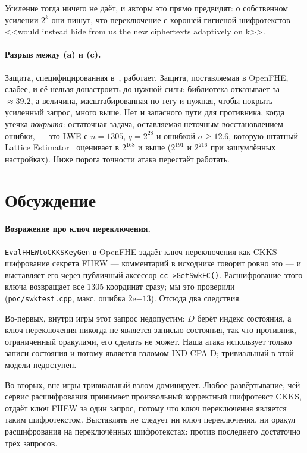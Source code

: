 \documentclass[11pt]{article}
\newcommand{\code}[1]{\texttt{#1}}
\begin{document}
Усиление тогда ничего не даёт, и авторы это прямо предвидят: о собственном усилении $2^k$ они пишут,
что переключение с хорошей гигиеной шифротекстов <<would instead hide from us the new ciphertexts
adaptively on k>>.

\paragraph{Разрыв между (a) и (c).}
Защита, специфицированная в~\cite{santato2026}, работает. Защита, поставляемая в OpenFHE,
слабее, и её нельзя донастроить до нужной силы: библиотека отказывает за
$\approx 39.2$, а величина, масштабированная по тегу и нужная, чтобы покрыть усиленный запрос, много
выше. Нет и запасного пути для противника, когда утечка \emph{покрыта}: остаточная задача, оставляемая
неточным восстановлением ошибки, --- это LWE с $n = 1305$, $q = 2^{28}$ и ошибкой $\sigma \geq 12.6$,
которую штатный Lattice Estimator~\cite{latticeestimator} оценивает в $2^{168}$ и выше ($2^{191}$ и
$2^{216}$ при зашумлённых настройках). Ниже порога точности атака перестаёт работать.

\section{Обсуждение}
\label{sec:discussion}

\paragraph{Возражение про ключ переключения.}
\code{EvalFHEWtoCKKSKeyGen} в OpenFHE задаёт ключ переключения как CKKS-шифрование секрета FHEW ---
комментарий в исходнике говорит ровно это --- и выставляет его через публичный аксессор
\code{cc->GetSwkFC()}. Расшифрование этого ключа возвращает все $1305$ координат сразу; мы это
проверили (\code{poc/swktest.cpp}, макс. ошибка $2\mathrm{e}{-13}$). Отсюда два следствия.

Во-первых, внутри игры этот запрос недопустим: $D$ берёт индекс состояния, а ключ переключения
никогда не является записью состояния, так что противник, ограниченный оракулами, его сделать не
может. Наша атака использует только записи состояния и потому является взломом IND-CPA-D;
тривиальный в этой модели недоступен.

Во-вторых, вне игры тривиальный взлом доминирует. Любое развёртывание, чей сервис расшифрования
принимает произвольный корректный шифротекст CKKS, отдаёт ключ FHEW за один запрос, потому что ключ
переключения является таким шифротекстом. Выставлять не следует ни ключ переключения, ни оракул
расшифрования на переключённых шифротекстах: против последнего достаточно трёх запросов.
\end{document}
